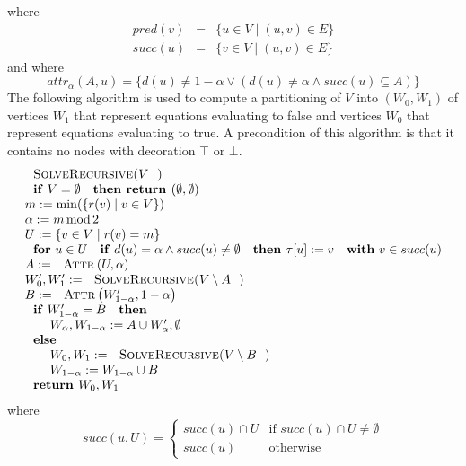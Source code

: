 where%
\begin{eqnarray*}
pred(v) &=&\{u\in V\mid (u,v)\in E\} \\
succ(u) &=&\{v\in V\mid (u,v)\in E\}
\end{eqnarray*}%
and where%
\begin{equation*}
attr_{\alpha }(A,u)=\{d(u)\neq 1-\alpha \vee \left( d(u)\neq \alpha \wedge
succ(u)\subseteq A\right) \}
\end{equation*}%
The following algorithm is used to compute a partitioning of $V$ into $%
\left( W_{0},W_{1}\right) $ of vertices $W_{1}$ that represent equations
evaluating to false and vertices $W_{0}$ that represent equations evaluating
to true. A precondition of this algorithm is that it contains no nodes with
decoration $\top $ or $\bot $.%
\begin{equation*}
\begin{array}{l}
\text{\textsc{SolveRecursive(}}V\text{\textsc{)}} \\ 
\text{\textbf{if} }V=\emptyset \text{ \textbf{then return }}(\emptyset
,\emptyset ) \\ 
m:=\min (\{r(v)\mid v\in V\}) \\ 
\alpha :=m\func{mod}2 \\ 
U:=\{v\in V\mid r(v)=m\} \\ 
\text{\textbf{for} }u\in U\text{ \textbf{if} }d(u)=\alpha \wedge succ(u)\neq
\emptyset \text{ \textbf{then }}\tau \lbrack u]:=v\text{ \textbf{with} }v\in
succ(u) \\ 
A:=\text{\textsc{Attr}}\left( U,\alpha \right)  \\ 
W_{0}^{\prime },W_{1}^{\prime }:=\text{\textsc{SolveRecursive(}}V\setminus A%
\text{)} \\ 
B:=\text{\textsc{Attr}}\left( W_{1-\alpha }^{\prime },1-\alpha \right)  \\ 
\text{\textbf{if} }W_{1-\alpha }^{\prime }=B\text{ \textbf{then}} \\ 
\qquad W_{\alpha },W_{1-\alpha }:=A\cup W_{\alpha }^{\prime },\emptyset  \\ 
\text{\textbf{else}} \\ 
\qquad W_{0},W_{1}:=\text{\textsc{SolveRecursive(}}V\setminus B\text{)} \\ 
\qquad W_{1-\alpha }:=W_{1-\alpha }\cup B \\ 
\text{\textbf{return }}W_{0},W_{1}%
\end{array}%
\end{equation*}%
where%
\begin{equation*}
succ(u,U)=\left\{ 
\begin{array}{ll}
succ(u)\cap U & \text{if }succ(u)\cap U\neq \emptyset  \\ 
succ(u) & \text{otherwise}%
\end{array}%
\right. 
\end{equation*}

